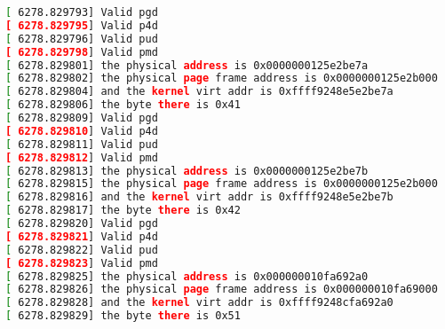 \documentclass[a4paper,10pt]{article}
\begin{document}
\begin{flushleft}
\begin{lstlisting}[language=sh, backgroundcolor=\color{backcolour}, basicstyle=\ttfamily\footnotesize]
[ 6278.829793] Valid pgd
[ 6278.829795] Valid p4d
[ 6278.829796] Valid pud
[ 6278.829798] Valid pmd
[ 6278.829801] the physical address is 0x0000000125e2be7a
[ 6278.829802] the physical page frame address is 0x0000000125e2b000
[ 6278.829804] and the kernel virt addr is 0xffff9248e5e2be7a
[ 6278.829806] the byte there is 0x41
[ 6278.829809] Valid pgd
[ 6278.829810] Valid p4d
[ 6278.829811] Valid pud
[ 6278.829812] Valid pmd
[ 6278.829813] the physical address is 0x0000000125e2be7b
[ 6278.829815] the physical page frame address is 0x0000000125e2b000
[ 6278.829816] and the kernel virt addr is 0xffff9248e5e2be7b
[ 6278.829817] the byte there is 0x42
[ 6278.829820] Valid pgd
[ 6278.829821] Valid p4d
[ 6278.829822] Valid pud
[ 6278.829823] Valid pmd
[ 6278.829825] the physical address is 0x000000010fa692a0
[ 6278.829826] the physical page frame address is 0x000000010fa69000
[ 6278.829828] and the kernel virt addr is 0xffff9248cfa692a0
[ 6278.829829] the byte there is 0x51
\end{lstlisting}

\end{flushleft}
\end{document}
